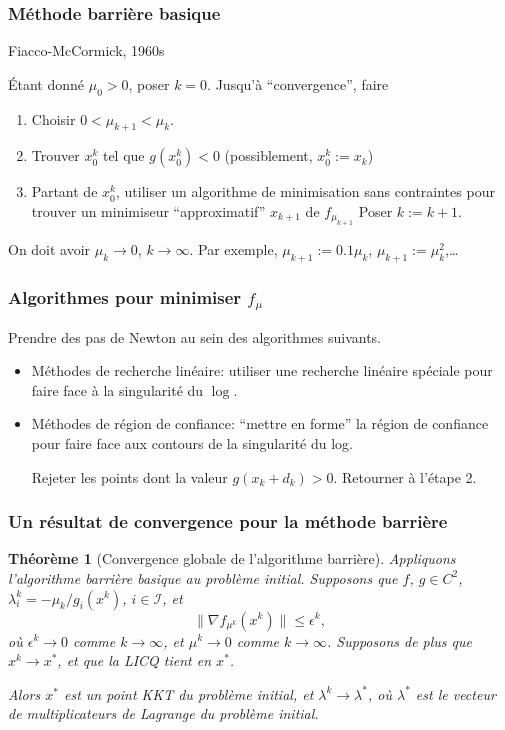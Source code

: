 \documentclass[usepdftitle=false,aspectratio=169]{beamer}
\newtheorem{thm}{Théorème}
\def\cI{\mathcal{I}}
\begin{document}
\begin{frame}
\frametitle{Méthode barrière basique}

Fiacco-McCormick, 1960s

\mbox{}

Étant donné $\mu_0 > 0$, poser $k = 0$.
Jusqu'à ``convergence'', faire
\begin{enumerate}
\item
Choisir
$
0 < \mu_{k+1} < \mu_{k}.
$
\item
Trouver $x_0^k$ tel que $g(x_0^k) < 0$ (possiblement, $x_0^k := x_k$)
\item
Partant de $x_0^k$, utiliser un algorithme de minimisation sans contraintes pour trouver un minimiseur ``approximatif'' $x_{k+1}$ de $f_{\mu_{k+1}}$
Poser $k := k+1$.
\end{enumerate}

\mbox{}

On doit avoir $\mu_k \rightarrow 0$, $k \rightarrow \infty$.
Par exemple, $\mu_{k+1} := 0.1\mu_k$, $\mu_{k+1} := \mu_k^2$,\ldots

\end{frame}

\begin{frame}
\frametitle{Algorithmes pour minimiser $f_{\mu}$}

Prendre des pas de Newton au sein des algorithmes suivants.
\begin{itemize}
\item
Méthodes de recherche linéaire:	utiliser une recherche linéaire spéciale pour faire face à la singularité du $\log$.
\item
Méthodes de région de confiance: ``mettre en forme'' la région de confiance pour faire face aux contours de la singularité du log.

\mbox{}

Rejeter les points dont la valeur $g(x_k+d_k) > 0$.
Retourner à l'étape 2.
\end{itemize}

\end{frame}

\begin{frame}
\frametitle{Un résultat de convergence pour la méthode barrière}

\begin{thm}[Convergence globale de l'algorithme barrière]
Appliquons l'algorithme barrière basique au problème initial.
Supposons que $f$, $g \in C^2$, $\lambda_i^k = -\mu_k/g_i(x^k)$, $i \in \cI$, et
$$
\| \nabla f_{\mu^k}(x^k) \| \leq \epsilon^k,
$$
où $\epsilon^k \rightarrow 0$ comme $k \rightarrow \infty$, et $\mu^k \rightarrow 0$ comme $k \rightarrow \infty$.
Supposons de plus que $x^k \rightarrow x^*$, et que la LICQ tient en $x^*$.

Alors $x^*$ est un point KKT du problème initial, et $\lambda^k \rightarrow \lambda^*$, où $\lambda^*$ est le vecteur de multiplicateurs de Lagrange du problème initial.
\end{thm}

\end{frame}
\end{document}
